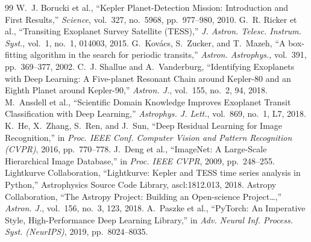 \documentclass[twocolumn,10pt]{article}
\begin{document}
\begin{thebibliography}{99}
\small
{} W.~J. Borucki et al., ``Kepler Planet-Detection Mission:
  Introduction and First Results,'' \emph{Science}, vol.~327, no.~5968, pp.~977--980,
  2010.
 G.~R. Ricker et al., ``Transiting Exoplanet Survey Satellite
  (TESS),'' \emph{J. Astron. Telesc. Instrum. Syst.}, vol.~1, no.~1, 014003, 2015.
 G.~Kov\'acs, S.~Zucker, and T.~Mazeh, ``A box-fitting algorithm
  in the search for periodic transits,'' \emph{Astron. Astrophys.}, vol.~391,
  pp.~369--377, 2002.
 C.~J. Shallue and A.~Vanderburg, ``Identifying Exoplanets with
  Deep Learning: A Five-planet Resonant Chain around Kepler-80 and an Eighth Planet
  around Kepler-90,'' \emph{Astron. J.}, vol.~155, no.~2, 94, 2018.
 M.~Ansdell et al., ``Scientific Domain Knowledge Improves
  Exoplanet Transit Classification with Deep Learning,'' \emph{Astrophys. J. Lett.},
  vol.~869, no.~1, L7, 2018.
 K.~He, X.~Zhang, S.~Ren, and J.~Sun, ``Deep Residual Learning for
  Image Recognition,'' in \emph{Proc. IEEE Conf. Computer Vision and Pattern
  Recognition (CVPR)}, 2016, pp.~770--778.
 J.~Deng et al., ``ImageNet: A Large-Scale Hierarchical Image
  Database,'' in \emph{Proc. IEEE CVPR}, 2009, pp.~248--255.
 Lightkurve Collaboration, ``Lightkurve: Kepler and TESS
  time series analysis in Python,'' Astrophysics Source Code Library, ascl:1812.013,
  2018.
 Astropy Collaboration, ``The Astropy Project: Building an
  Open-science Project\ldots,'' \emph{Astron. J.}, vol.~156, no.~3, 123, 2018.
 A.~Paszke et al., ``PyTorch: An Imperative Style,
  High-Performance Deep Learning Library,'' in \emph{Adv. Neural Inf. Process. Syst.
  (NeurIPS)}, 2019, pp.~8024--8035.
\end{thebibliography}
\end{document}
